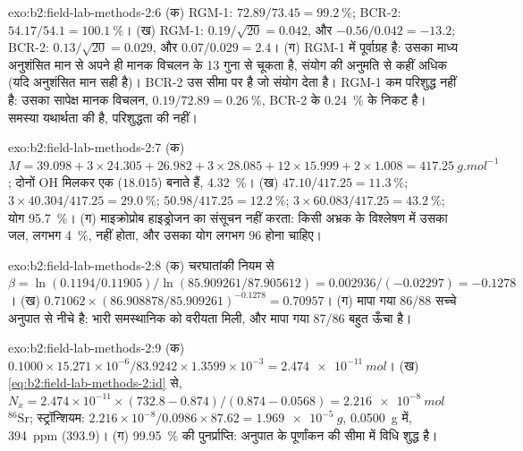 \begin{solution}{exo:b2:field-lab-methods-2:6}
(क) RGM-1: $72.89/73.45 = \qty{99.2}{\percent}$; BCR-2: $54.17/54.1 = \qty{100.1}{\percent}$।
(ख) RGM-1: $0.19/\sqrt{20} = 0.042$, और $-0.56/0.042 = -13.2$; BCR-2: $0.13/\sqrt{20} = 0.029$, और
$0.07/0.029 = 2.4$। (ग) RGM-1 में पूर्वाग्रह है: उसका माध्य अनुशंसित मान से अपने ही मानक विचलन के 13 गुना से
चूकता है, संयोग की अनुमति से कहीं अधिक (यदि अनुशंसित मान सही है)। BCR-2 उस सीमा पर है जो
संयोग देता है। RGM-1 कम परिशुद्ध नहीं है: उसका सापेक्ष मानक विचलन,
$0.19/72.89 = \qty{0.26}{\percent}$, BCR-2 के \qty{0.24}{\percent} के निकट है। समस्या
यथार्थता की है, परिशुद्धता की नहीं।
\end{solution}

\begin{solution}{exo:b2:field-lab-methods-2:7}
(क) $M = 39.098 + 3 \times 24.305 + 26.982 + 3 \times 28.085 + 12 \times 15.999 + 2 \times 1.008 =
\qty{417.25}{g.mol^{-1}}$; दोनों OH मिलकर एक  ($18.015$) बनाते हैं, \qty{4.32}{\percent}।
(ख)  $47.10/417.25 = \qty{11.3}{\percent}$;  $3 \times 40.304/417.25 =
\qty{29.0}{\percent}$;  $50.98/417.25 = \qty{12.2}{\percent}$;  $3 \times
60.083/417.25 = \qty{43.2}{\percent}$; योग \qty{95.7}{\percent}। (ग) माइक्रोप्रोब हाइड्रोजन का
संसूचन नहीं करता: किसी अभ्रक के विश्लेषण में उसका जल, लगभग \qty{4}{\percent}, नहीं होता, और उसका योग लगभग
96 होना चाहिए।
\end{solution}

\begin{solution}{exo:b2:field-lab-methods-2:8}
(क) चरघातांकी नियम से $\beta = \ln(0.1194/0.11905)/\ln(85.909261/87.905612) = 0.002936/(-0.02297) = -0.1278$।
(ख) $0.71062 \times (86.908878/85.909261)^{-0.1278} = 0.70957$। (ग) मापा गया 86/88 सच्चे अनुपात से
नीचे है: भारी समस्थानिक को वरीयता मिली, और मापा गया 87/86 बहुत ऊँचा है।
\end{solution}

\begin{solution}{exo:b2:field-lab-methods-2:9}
(क) $0.1000 \times 15.271 \times 10^{-6}/83.9242 \times 1.3599 \times 10^{-3} = \qty{2.474e-11}{mol}$।
(ख) \eqref{eq:b2:field-lab-methods-2:id} से, $N_x = 2.474 \times 10^{-11} \times (732.8 -
0.874)/(0.874 - 0.0568) = \qty{2.216e-8}{mol}$ $^{86}\mathrm{Sr}$; स्ट्रॉन्शियम: $2.216 \times
10^{-8}/0.0986 \times 87.62 = \qty{1.969e-5}{g}$, \qty{0.0500}{g} में, \qty{394}{ppm} (393.9)।
(ग) \qty{99.95}{\percent} की पुनर्प्राप्ति: अनुपात के पूर्णांकन की सीमा में विधि शुद्ध है।
\end{solution}

